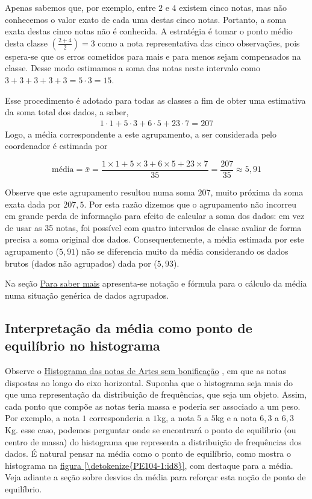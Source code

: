 Apenas sabemos que, por exemplo, entre $2$ e $4$ existem cinco notas, mas não conhecemos o valor exato de cada uma destas cinco notas. Portanto, a soma exata destas cinco notas não é conhecida. A estratégia é tomar o ponto médio desta classe \(\left (\frac{2+4}{2}\right )=3\) como a nota representativa das cinco observações, pois espera-se que os erros cometidos para mais e para menos sejam compensados na classe. Desse modo estimamos a soma das notas neste intervalo como \(3+3+3+3+3=5\cdot 3=15\).

Esse procedimento é adotado para todas as classes a fim de obter uma estimativa da soma total dos dados, a saber,
\begin{equation*}
\begin{split}1\cdot 1+5\cdot 3+6\cdot 5+23\cdot 7=207\end{split}
\end{equation*}
Logo, a média correspondente a este agrupamento, a ser considerada pelo coordenador é estimada por

\begin{equation*}
\text{média}=\bar{x}=\frac{1\times 1+5\times 3+6\times 5+23\times 7}{35}=\frac{207}{35}\approx 5,91
\end{equation*}

Observe que este agrupamento resultou numa soma $207$, muito próxima da soma exata dada por $207,5$. Por esta razão dizemos que o agrupamento não incorreu em grande perda de informação para efeito de calcular a soma dos dados: em vez de usar as 35 notas, foi possível com quatro intervalos de classe avaliar de forma precisa a soma original dos dados. Consequentemente, a média estimada por este agrupamento ($5{,}91$) não se diferencia muito da média considerando os dados brutos (dados não agrupados) dada por ($5{,}93$).

Na seção \hyperref[\detokenize{PE104-A:sec-para-saber-mais}]{Para saber mais} apresenta-se notação e fórmula para o cálculo da média numa situação genérica de dados agrupados.

\subsection{Interpretação da média como ponto de equilíbrio no histograma}

Observe o \hyperref[\detokenize{PE104-0:fig-histograma-notas-sem-bonificacao}]{Histograma das notas de Artes sem bonificação} , em que as notas dispostas ao longo do eixo horizontal. Suponha que o histograma seja mais do que uma representação da distribuição de frequências, que seja um objeto. Assim, cada ponto que compõe as notas teria massa e poderia ser associado a um peso. Por exemplo, a nota $1$ corresponderia a $1$kg, a nota $5$ a $5$kg e a nota $6{,}3$ a $6{,}3$ Kg. esse caso, podemos perguntar onde se encontrará o ponto de equilíbrio (ou centro de massa) do histograma que representa a distribuição de frequências dos dados. É natural pensar na média como o ponto de equilíbrio, como mostra o histograma na \hyperref[\detokenize{PE104-1:id8}]{figura \ref{\detokenize{PE104-1:id8}}}, com destaque para a média. Veja adiante a seção sobre desvios da média para reforçar esta noção de ponto de equilíbrio.


